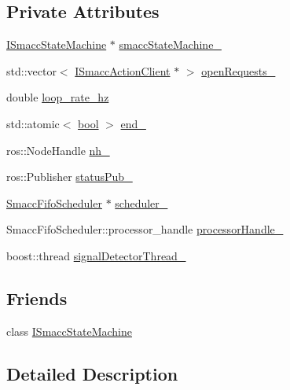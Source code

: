 \subsection*{Private Attributes}
\begin{DoxyCompactItemize}
\item 
\hyperlink{classsmacc_1_1ISmaccStateMachine}{I\+Smacc\+State\+Machine} $\ast$ \hyperlink{classsmacc_1_1SignalDetector_a46025de6ac7b5980e22144f9703236a4}{smacc\+State\+Machine\+\_\+}
\item 
std\+::vector$<$ \hyperlink{classsmacc_1_1ISmaccActionClient}{I\+Smacc\+Action\+Client} $\ast$ $>$ \hyperlink{classsmacc_1_1SignalDetector_ac1b45dada88384ad38a12eea2d53205a}{open\+Requests\+\_\+}
\item 
double \hyperlink{classsmacc_1_1SignalDetector_a41a2ae4262ed350f46d8b886bdc1dfa5}{loop\+\_\+rate\+\_\+hz}
\item 
std\+::atomic$<$ \hyperlink{classbool}{bool} $>$ \hyperlink{classsmacc_1_1SignalDetector_aaee266393c01693528a2d74b1f2354a2}{end\+\_\+}
\item 
ros\+::\+Node\+Handle \hyperlink{classsmacc_1_1SignalDetector_a5c416677fd537afc79f2fbc2e68b2dee}{nh\+\_\+}
\item 
ros\+::\+Publisher \hyperlink{classsmacc_1_1SignalDetector_ae065bbd4e699e5fce00fbc508dedd4c1}{status\+Pub\+\_\+}
\item 
\hyperlink{smacc__fifo__scheduler_8h_a0063e275231c80d5f97df21d17257bf7}{Smacc\+Fifo\+Scheduler} $\ast$ \hyperlink{classsmacc_1_1SignalDetector_adaee5b9b91d0e6305dc1ab30f7ab566d}{scheduler\+\_\+}
\item 
Smacc\+Fifo\+Scheduler\+::processor\+\_\+handle \hyperlink{classsmacc_1_1SignalDetector_a9a77dc9f0e9f8f56dff5e76077abcb78}{processor\+Handle\+\_\+}
\item 
boost\+::thread \hyperlink{classsmacc_1_1SignalDetector_a4346a400cd37eafc5d1d2e63d975785e}{signal\+Detector\+Thread\+\_\+}
\end{DoxyCompactItemize}
\subsection*{Friends}
\begin{DoxyCompactItemize}
\item 
class \hyperlink{classsmacc_1_1SignalDetector_a0e71d23a61c07d55f419d02237d03b6a}{I\+Smacc\+State\+Machine}
\end{DoxyCompactItemize}


\subsection{Detailed Description}


